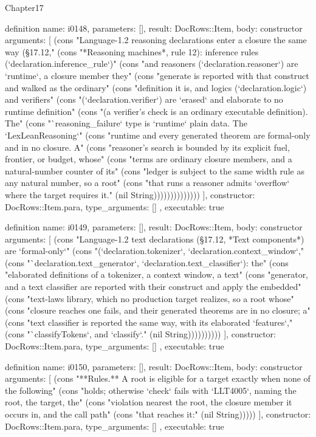 \begin{lexlean}{Chapter17}
\begin{semanticmodule}
definition{
  name: i0148,
  parameters: [],
  result: DocRows::Item,
  body: constructor{
    arguments: [
      (cons "Language-1.2 reasoning declarations enter a closure the same way (§17.12," (cons "*Reasoning machines*, rule 12): inference rules (`declaration.inference_rule`)" (cons "and reasoners (`declaration.reasoner`) are `runtime`, a closure member they" (cons "generate is reported with that construct and walked as the ordinary" (cons "definition it is, and logics (`declaration.logic`) and verifiers" (cons "(`declaration.verifier`) are `erased` and elaborate to no runtime definition" (cons "(a verifier's check is an ordinary executable definition). The" (cons "`reasoning_failure` type is `runtime` plain data. The `LexLeanReasoning`" (cons "runtime and every generated theorem are formal-only and in no closure. A" (cons "reasoner's search is bounded by its explicit fuel, frontier, or budget, whose" (cons "terms are ordinary closure members, and a natural-number counter of its" (cons "ledger is subject to the same width rule as any natural number, so a root" (cons "that runs a reasoner admits `overflow` where the target requires it." (nil String))))))))))))))
    ],
    constructor: DocRows::Item.para,
    type_arguments: []
  },
  executable: true
}

definition{
  name: i0149,
  parameters: [],
  result: DocRows::Item,
  body: constructor{
    arguments: [
      (cons "Language-1.2 text declarations (§17.12, *Text components*) are `formal-only`" (cons "(`declaration.tokenizer`, `declaration.context_window`," (cons "`declaration.text_generator`, `declaration.text_classifier`): the" (cons "elaborated definitions of a tokenizer, a context window, a text" (cons "generator, and a text classifier are reported with their construct and apply the embedded" (cons "text-laws library, which no production target realizes, so a root whose" (cons "closure reaches one fails, and their generated theorems are in no closure; a" (cons "text classifier is reported the same way, with its elaborated `features`," (cons "`classifyTokens`, and `classify`." (nil String))))))))))
    ],
    constructor: DocRows::Item.para,
    type_arguments: []
  },
  executable: true
}

definition{
  name: i0150,
  parameters: [],
  result: DocRows::Item,
  body: constructor{
    arguments: [
      (cons "**Rules.** A root is eligible for a target exactly when none of the following" (cons "holds; otherwise `check` fails with `LLT4005`, naming the root, the target, the" (cons "violation nearest the root, the closure member it occurs in, and the call path" (cons "that reaches it:" (nil String)))))
    ],
    constructor: DocRows::Item.para,
    type_arguments: []
  },
  executable: true
}


\end{semanticmodule}
\end{lexlean}
